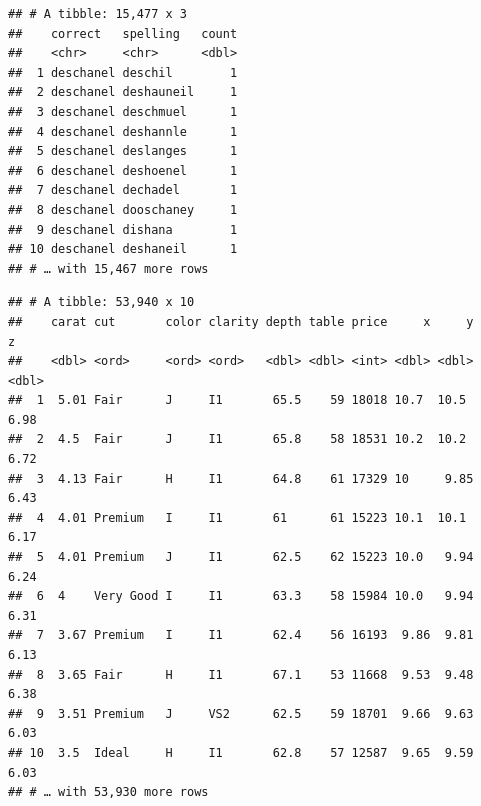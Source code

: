 \documentclass[
]{book}
\newenvironment{Shaded}{\begin{snugshade}}{\end{snugshade}}
\newcommand{\KeywordTok}[1]{\textcolor[rgb]{0.13,0.29,0.53}{\textbf{#1}}}
\newcommand{\NormalTok}[1]{#1}
\newcommand{\OperatorTok}[1]{\textcolor[rgb]{0.81,0.36,0.00}{\textbf{#1}}}
\newcommand{\StringTok}[1]{\textcolor[rgb]{0.31,0.60,0.02}{#1}}
\begin{document}
\begin{verbatim}
## # A tibble: 15,477 x 3
##    correct   spelling   count
##    <chr>     <chr>      <dbl>
##  1 deschanel deschil        1
##  2 deschanel deshauneil     1
##  3 deschanel deschmuel      1
##  4 deschanel deshannle      1
##  5 deschanel deslanges      1
##  6 deschanel deshoenel      1
##  7 deschanel dechadel       1
##  8 deschanel dooschaney     1
##  9 deschanel dishana        1
## 10 deschanel deshaneil      1
## # … with 15,467 more rows
\end{verbatim}

\begin{Shaded}
\end{Shaded}

\begin{verbatim}
## # A tibble: 53,940 x 10
##    carat cut       color clarity depth table price     x     y     z
##    <dbl> <ord>     <ord> <ord>   <dbl> <dbl> <int> <dbl> <dbl> <dbl>
##  1  5.01 Fair      J     I1       65.5    59 18018 10.7  10.5   6.98
##  2  4.5  Fair      J     I1       65.8    58 18531 10.2  10.2   6.72
##  3  4.13 Fair      H     I1       64.8    61 17329 10     9.85  6.43
##  4  4.01 Premium   I     I1       61      61 15223 10.1  10.1   6.17
##  5  4.01 Premium   J     I1       62.5    62 15223 10.0   9.94  6.24
##  6  4    Very Good I     I1       63.3    58 15984 10.0   9.94  6.31
##  7  3.67 Premium   I     I1       62.4    56 16193  9.86  9.81  6.13
##  8  3.65 Fair      H     I1       67.1    53 11668  9.53  9.48  6.38
##  9  3.51 Premium   J     VS2      62.5    59 18701  9.66  9.63  6.03
## 10  3.5  Ideal     H     I1       62.8    57 12587  9.65  9.59  6.03
## # … with 53,930 more rows
\end{verbatim}

\begin{Shaded}
\end{Shaded}
\end{document}
